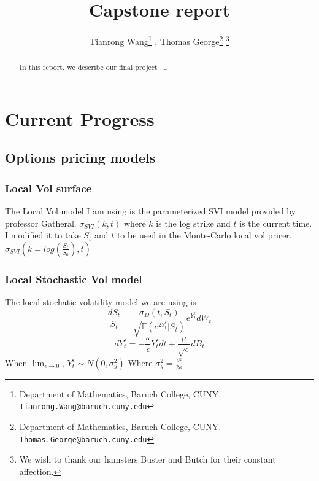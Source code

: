 \documentclass[12pt]{article}
\numberwithin{equation}{section}
\newcommand{\E}{\mathbb{E}}
\begin{document}
\title{\bf Capstone report}

\author{Tianrong Wang\footnote{Department of Mathematics, Baruch College, CUNY. {\tt  Tianrong.Wang@baruch.cuny.edu}}{\setcounter{footnote}{1}} , Thomas George\footnote{Department of Mathematics, Baruch College, CUNY. {\tt  Thomas.George@baruch.cuny.edu}}{\setcounter{footnote}{2}} \thanks{We wish to thank our hamsters Buster and Butch for their constant affection.}
}



\maketitle\thispagestyle{empty}
 



\begin{abstract}
In this report, we describe our final project ....
\end{abstract}

%
%
%
%

\section{Current Progress}
\subsection{Options pricing models}
\subsubsection{Local Vol surface}
The Local Vol model I am using is the parameterized SVI model provided by professor Gatheral.
$\sigma_{SVI}(k,t)$ where $k$ is the log strike and $t$ is the current time. I modified it to take $S_t$ and $t$ to be used in the Monte-Carlo local vol pricer.
$\sigma_{SVI}(k=log(\frac{S_t}{S_0}),t)$

\subsubsection{Local Stochastic Vol model}
The local stochatic volatility model we are using is
\begin{equation} \label{eq:1}
    \frac{dS_t}{S_t}=\frac{\sigma_D(t,S_t)}{\sqrt{\E(e^{2Y_t^\epsilon}|S_t)}}e^{Y_t^\epsilon}dW_t
\end{equation} 
\[
    dY_t^\epsilon=-\frac \kappa \epsilon Y_t^\epsilon dt + \frac{\mu}{\sqrt{\epsilon}}dB_t
\]
When $\lim_{\epsilon \to 0}$, $Y_t^\epsilon\sim N(0,\sigma_y^2)$ Where $\sigma_y^2=\frac{\nu^2}{2\kappa}$
\end{document}
